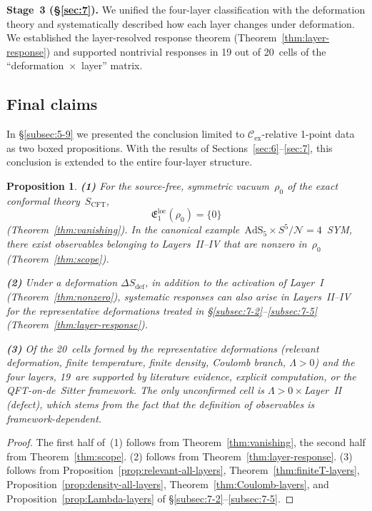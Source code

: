 \documentclass[
  aps,
  prd,
  preprint,
  groupedaddress,
  nofootinbib,
  longbibliography
]{revtex4-2}
\newtheorem{proposition}[definition]{Proposition}
\theoremstyle{remark}
\newcommand{\Cex}{\mathcal{C}_{\mathrm{ex}}}
\newcommand{\N}{\mathcal{N}}
\newcommand{\AdS}{\mathrm{AdS}}
\begin{document}
\textbf{Stage~3 (\S\ref{sec:7}).}
We unified the four-layer classification with the deformation
theory and systematically described how each layer changes under
deformation.
We established the layer-resolved response theorem
(Theorem~\ref{thm:layer-response}) and supported nontrivial
responses in 19 out of 20~cells of the
``deformation~$\times$~layer'' matrix.

\subsection{Final claims}\label{subsec:8-2}

In \S\ref{subsec:5-9} we presented the conclusion limited to
$\Cex$-relative 1-point data as two boxed propositions.
With the results of Sections~\ref{sec:6}--\ref{sec:7}, this
conclusion is extended to the entire four-layer structure.

\begin{proposition}\label{prop:final-claim}
\textbf{(1)} For the source-free, symmetric vacuum~$\rho_0$
of the exact conformal theory~$S_{\mathrm{CFT}}$,
\begin{equation}\label{eq:final-vanish}
  \mathfrak{E}_1^{\mathrm{loc}}(\rho_0) = \{0\}
\end{equation}
(Theorem~\ref{thm:vanishing}).
In the canonical
example~$\AdS_5\times S^5/\N=4$~SYM, there exist observables
belonging to Layers~II--IV that are nonzero
in~$\rho_0$ (Theorem~\ref{thm:scope}).

\textbf{(2)} Under a deformation
$\Delta S_{\mathrm{def}}$, in addition to the activation of
Layer~I (Theorem~\ref{thm:nonzero}), systematic responses
can also arise in Layers~II--IV for the representative
deformations treated in
\S\ref{subsec:7-2}--\ref{subsec:7-5}
(Theorem~\ref{thm:layer-response}).

\textbf{(3)} Of the 20~cells formed by the representative
deformations (relevant deformation, finite temperature, finite
density, Coulomb branch, $\Lambda>0$) and the four layers,
19~are supported by literature evidence, explicit computation,
or the QFT-on-de~Sitter framework.
The only unconfirmed cell is
$\Lambda>0\times$Layer~II (defect), which stems from the fact
that the definition of observables is framework-dependent.
\end{proposition}

\begin{proof}
The first half of~(1) follows from
Theorem~\ref{thm:vanishing}, the second half from
Theorem~\ref{thm:scope}.
(2) follows from Theorem~\ref{thm:layer-response}.
(3) follows from
Proposition~\ref{prop:relevant-all-layers},
Theorem~\ref{thm:finiteT-layers},
Proposition~\ref{prop:density-all-layers},
Theorem~\ref{thm:Coulomb-layers}, and
Proposition~\ref{prop:Lambda-layers}
of \S\ref{subsec:7-2}--\ref{subsec:7-5}.
\end{proof}
\end{document}
